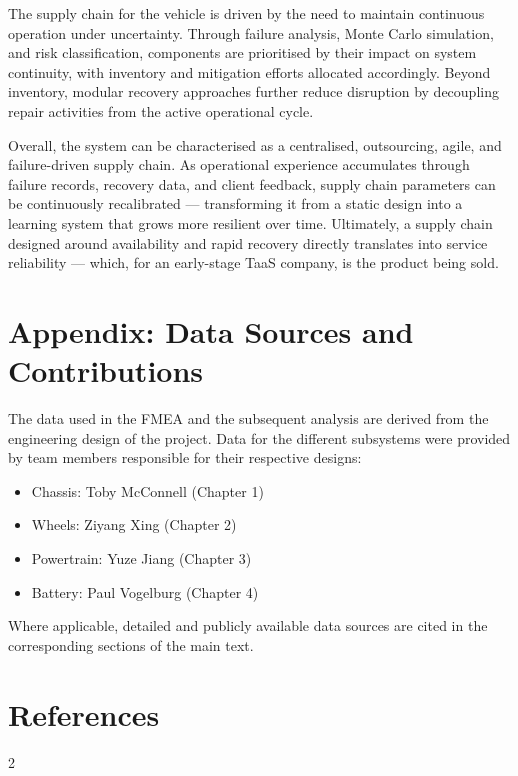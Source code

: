\documentclass[11pt, a4paper]{report}
\numberwithin{equation}{section}
\newcommand{\compactbib}{%
  \vspace{-16pt}%
  \enlargethispage{20pt}%
  \section*{References}%
  \vspace{-33pt}%
  \begingroup
    \begin{singlespace}%
      \begin{multicols}{2}%
        \scriptsize
        \setlength{\bibitemsep}{0pt}%
        \printbibliography[heading=none]%
      \end{multicols}%
    \end{singlespace}%
  \endgroup
}
\begin{document}
\begin{refsection}
The supply chain for the vehicle is driven by the need to maintain continuous operation under uncertainty. Through failure analysis, Monte Carlo simulation, and risk classification, components are prioritised by their impact on system continuity, with inventory and mitigation efforts allocated accordingly. Beyond inventory, modular recovery approaches further reduce disruption by decoupling repair activities from the active operational cycle.

Overall, the system can be characterised as a centralised, outsourcing, agile, and failure-driven supply chain. As operational experience accumulates through failure records, recovery data, and client feedback, supply chain parameters can be continuously recalibrated — transforming it from a static design into a learning system that grows more resilient over time. Ultimately, a supply chain designed around availability and rapid recovery directly translates into service reliability — which, for an early-stage TaaS company, is the product being sold.

\section*{Appendix: Data Sources and Contributions}

The data used in the FMEA and the subsequent analysis are derived from the engineering design of the project. Data for the different subsystems were provided by team members responsible for their respective designs:

\begin{itemize}
    \item Chassis: Toby McConnell (Chapter 1)
    \item Wheels: Ziyang Xing (Chapter 2)    
    \item Powertrain: Yuze Jiang (Chapter 3)
    \item Battery: Paul Vogelburg (Chapter 4)
\end{itemize}

Where applicable, detailed and publicly available data sources are cited in the corresponding sections of the main text.

\compactbib
\end{refsection}

\end{document}
